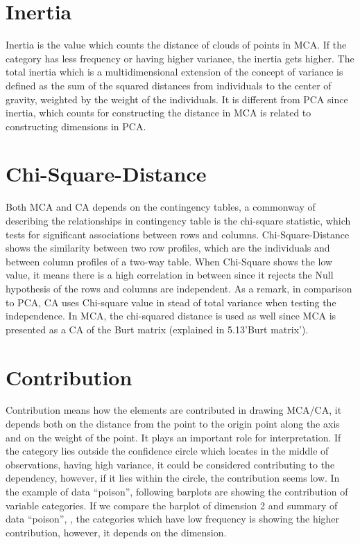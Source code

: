 \documentclass[]{book}
\begin{document}
\hypertarget{inertia}{%
\section{Inertia}\label{inertia}}

Inertia is the value which counts the distance of clouds of points in MCA. If the category has less frequency or having higher variance, the inertia gets higher. The total inertia which is a multidimensional extension of the concept of variance is defined as the sum of the squared distances from individuals to the center of gravity, weighted by the weight of the individuals.
It is different from PCA since inertia, which counts for constructing the distance in MCA is related to constructing dimensions in PCA.

\hypertarget{chi-square-distance}{%
\section{Chi-Square-Distance}\label{chi-square-distance}}

Both MCA and CA depends on the contingency tables, a commonway of describing the relationships in contingency table is the chi-square statistic, which tests for significant associations between rows and columns.
Chi-Square-Distance shows the similarity between two row profiles, which are the individuals and between column profiles of a two-way table. When Chi-Square shows the low value, it means there is a high correlation in between since it rejects the Null hypothesis of the rows and columns are independent. As a remark, in comparison to PCA, CA uses Chi-square value in stead of total variance when testing the independence. In MCA, the chi-squared distance is used as well since MCA is presented as a CA of the Burt matrix (explained in 5.13'Burt matrix').

\hypertarget{contribution}{%
\section{Contribution}\label{contribution}}

Contribution means how the elements are contributed in drawing MCA/CA, it depends both on the distance from the point to the origin point along the axis and on the weight of the point. It plays an important role for interpretation. If the category lies outside the confidence circle which locates in the middle of observations, having high variance, it could be considered contributing to the dependency, however, if it lies within the circle, the contribution seems low.
In the example of data ``poison'', following barplots are showing the contribution of variable categories. If we compare the barplot of dimension 2 and summary of data ``poison'', , the categories which have low frequency is showing the higher contribution, however, it depends on the dimension.
\end{document}
